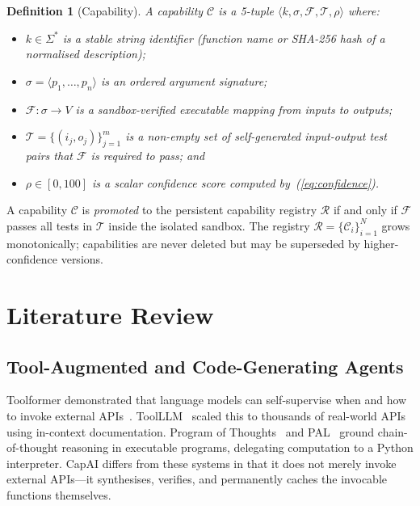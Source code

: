 \documentclass[conference]{IEEEtran}
\newtheorem{definition}{Definition}
\begin{document}
\begin{definition}[Capability]
A \emph{capability} $\mathcal{C}$ is a 5-tuple
$\langle k, \sigma, \mathcal{F}, \mathcal{T}, \rho \rangle$ where:
\begin{itemize}
  \item $k \in \Sigma^*$ is a stable string identifier (function name or
        SHA-256 hash of a normalised description);
  \item $\sigma = \langle p_1, \ldots, p_n \rangle$ is an ordered
        argument signature;
  \item $\mathcal{F}: \sigma \to V$ is a sandbox-verified executable
        mapping from inputs to outputs;
  \item $\mathcal{T} = \{(i_j, o_j)\}_{j=1}^{m}$ is a non-empty set of
        self-generated input-output test pairs that $\mathcal{F}$ is
        required to pass; and
  \item $\rho \in [0, 100]$ is a scalar confidence score computed
        by~(\ref{eq:confidence}).
\end{itemize}
\end{definition}

A capability $\mathcal{C}$ is \emph{promoted} to the persistent
capability registry $\mathcal{R}$ if and only if $\mathcal{F}$ passes
all tests in $\mathcal{T}$ inside the isolated sandbox.
The registry $\mathcal{R} = \{ \mathcal{C}_i \}_{i=1}^{N}$ grows
monotonically; capabilities are never deleted but may be superseded by
higher-confidence versions.

\section{Literature Review}
\label{sec:related}

\subsection{Tool-Augmented and Code-Generating Agents}

Toolformer demonstrated that language models can self-supervise when and
how to invoke external APIs~\cite{schick2023toolformer}.
ToolLLM~\cite{qin2023toolllm} scaled this to thousands of real-world APIs
using in-context documentation.
Program of Thoughts~\cite{chen2022pot} and PAL~\cite{gao2023pal} ground
chain-of-thought reasoning in executable programs, delegating computation
to a Python interpreter.
CapAI differs from these systems in that it does not merely invoke
external APIs---it synthesises, verifies, and permanently caches the
invocable functions themselves.
\end{document}
